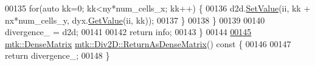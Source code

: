 \begin{DoxyCode}
00135     \textcolor{keywordflow}{for}(\textcolor{keyword}{auto} kk=0; kk<ny*num\_cells\_x; kk++) \{
00136       d2d.\hyperlink{classmtk_1_1DenseMatrix_ae0f873a6d3a734da467cafb817da64ae}{SetValue}(ii, kk + nx*num\_cells\_y, dyx.\hyperlink{classmtk_1_1DenseMatrix_a87fb785713c04b13767947cc3325ce7c}{GetValue}(ii, kk));
00137     \}
00138   \}
00139 
00140   divergence\_ = d2d;
00141 
00142   \textcolor{keywordflow}{return} info;
00143 \}
00144 
\hypertarget{mtk__div__2d_8cc_source_l00145}{}\hyperlink{classmtk_1_1Div2D_ae4f880fb28ad2379906e9ac0dfaa4458}{00145} \hyperlink{classmtk_1_1DenseMatrix}{mtk::DenseMatrix} \hyperlink{classmtk_1_1Div2D_ae4f880fb28ad2379906e9ac0dfaa4458}{mtk::Div2D::ReturnAsDenseMatrix}()\textcolor{keyword}{ const }\{
00146 
00147   \textcolor{keywordflow}{return} divergence\_;
00148 \}
\end{DoxyCode}
